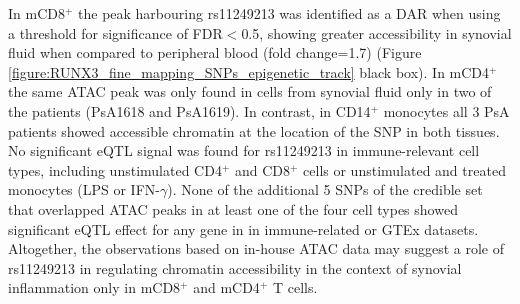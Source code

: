 In mCD8$^+$ the peak harbouring rs11249213 was identified as a DAR when using a threshold for significance of FDR$<$0.5, showing greater accessibility in synovial fluid when compared to peripheral blood (fold change=1.7) (Figure \ref{figure:RUNX3_fine_mapping_SNPs_epigenetic_track} black box). In mCD4$^+$ the same ATAC peak was only found in cells from synovial fluid only in two of the patients (PsA1618 and PsA1619). In contrast, in CD14$^+$ monocytes all 3 PsA patients showed accessible chromatin at the location of the SNP in both tissues. No significant eQTL signal was found for rs11249213 in immune-relevant cell types, including unstimulated CD4$^+$ and CD8$^+$ cells or unstimulated and treated monocytes (LPS or IFN-$\gamma$). None of the additional 5 SNPs of the credible set that overlapped ATAC peaks in at least one of the four cell types showed significant eQTL effect for any gene in in immune-related or GTEx datasets. Altogether, the observations based on in-house ATAC data may suggest a role of rs11249213 in regulating chromatin accessibility in the context of synovial inflammation only in mCD8$^+$ and mCD4$^+$ T cells.

